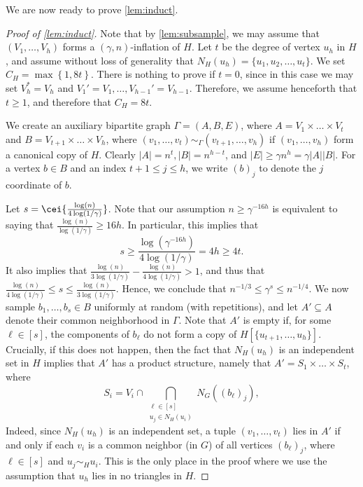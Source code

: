 We are now ready to prove \cref{lem:induct}.

\begin{proof}[Proof of \cref{lem:induct}]
Note that by \cref{lem:subsample}, we may assume that $(V_1,\dots,V_h)$ forms a $(\gamma,n)$-inflation of $H$.
Let $t$ be the degree of vertex $u_h$ in $H$, and assume without loss of generality that $N_H(u_h) = \{u_1,u_2,\dots,u_t\}$. 
We set $C_H = \max \left\{ 1, 8t \right\}$. 
There is nothing to prove if $t=0$, since in this case we may set $V_h^*=V_h$ and $V_1'=V_1,\dots,V_{h-1}'=V_{h-1}$. Therefore, we assume henceforth that $t\geq 1$, and therefore that $C_H=8t$.


We create an auxiliary bipartite graph $\Gamma = (A,B,E)$, where $A = V_1\times \dots\times V_t$ and $B = V_{t+1}\times\dots \times V_h$, where $(v_1,\dots,v_t)\sim_\Gamma (v_{t+1},\dots,v_h)$ if $(v_1,\dots,v_h)$ form a canonical copy of $H$. Clearly $|A|= n^t, |B|=n^{h-t}$, and $|E|\ge \gamma n^h = \gamma |A||B|$. For a vertex $b \in B$ and an index $t +1 \leq j \leq h$, we write $(b)_j$ to denote the $j$ coordinate of $b$.


Let $s = \cei{\frac{\log(n)}{4\log(1/\gamma)}}$. Note that our assumption $n \geq \gamma^{-16h}$ is equivalent to saying that $\frac{\log (n)}{\log(1/\gamma)}\geq 16h$. In particular, this implies that
\begin{equation}\label{eq:s LB}
s \geq \frac{\log(\gamma^{-16h})}{4\log(1/\gamma)} = 4h \geq 4t.
\end{equation}
It also implies that $\frac{\log(n)}{3 \log(1/\gamma)} - \frac{\log(n)}{4 \log(1/\gamma)}>1$, and thus that
$\frac{\log(n)}{4 \log(1/\gamma)}\leq s \leq \frac{\log(n)}{3 \log(1/\gamma)}$. Hence, we conclude that $n^{-1/3}\leq \gamma^s \leq n^{-1/4}$.
We now sample $b_1,\dots,b_s\in B$ uniformly at random (with repetitions), and let $A'\subseteq A$ denote their common neighborhood in $\Gamma$. Note that $A'$ is empty if, for some $\ell \in [s]$, the components of $b_\ell$ do not form a copy of $H[\{u_{t+1},\dots,u_h\}]$. 
Crucially, if this does not happen, then the fact that $N_H(u_h)$ is an independent set in $H$ implies that $A'$ has a product structure, namely that $A' = S_1 \times \dots \times S_t$, where
\[
S_i =
V_i\cap \bigcap_{\substack{\ell \in [s]\\u_j \in N_H(u_i)}} N_G((b_\ell)_j),
\]
Indeed, since $N_H(u_h)$ is an independent set, a tuple $(v_1,\dots,v_t)$ lies in $A'$ if and only if each $v_i$ is a common neighbor (in $G$) of all vertices $(b_\ell)_j$, where $\ell \in [s]$ and $u_j \sim_H u_i$. This is the only place in the proof where we use the assumption that $u_h$ lies in no triangles in $H$.



\end{proof}
